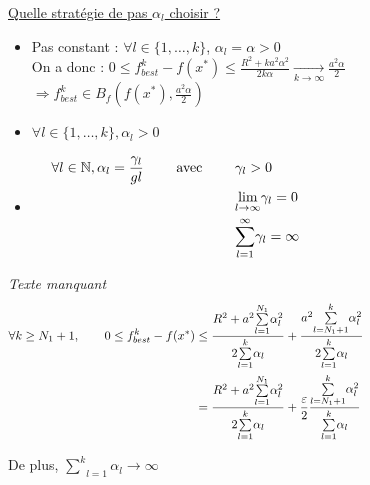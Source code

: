 \documentclass[12pt,a4paper]{article}
\begin{document}
\noindent \underline{Quelle stratégie de pas $\alpha_l$ choisir ?}
\begin{itemize}
    \item Pas constant : $\forall l \in \{1, \dots, k\}$, $\alpha_l = \alpha > 0$\\
    
    On a donc : $0 \leq f^k_{best} - f(x^*) \leq \frac{R^2 + ka^2 \alpha^2}{2 k \alpha} \xrightarrow[k \rightarrow \infty]{} \frac{a^2 \alpha}{2}$\\
    $\Rightarrow f^k_{best} \in B_f(f(x^*), \frac{a^2 \alpha}{2})$\\

    \item $\forall l \in \{1, \dots, k\}, \alpha_l > 0$\\
    
    \item \begin{align*}
        \forall l \in \mathbb{N}, \alpha_l = \frac{\gamma_l}{gl} \qquad \text{ avec } \qquad &\gamma_l > 0 \hspace{14.5cm}\\
        &\underset{l \rightarrow \infty}{\lim} \gamma_l = 0\\
        &\underset{l = 1}{\overset{\infty}{\sum}} \gamma_l = \infty\\
    \end{align*}
\end{itemize}

\textit{Texte manquant}\\




\begin{align*}
    \forall k \geq N_1 + 1, \qquad 0 \leq f^k_{best} - f(x^*) &\leq \frac{R^2 + a^2 \underset{l = 1}{\overset{N_1}{\sum}} \alpha_l^2}{2 \underset{l = 1}{\overset{k}{\sum}} \alpha_l} + \frac{a^2 \underset{l = N_1 + 1}{\overset{k}{\sum}} \alpha_l^2}{2 \underset{l = 1}{\overset{k}{\sum}} \alpha_l}  \hspace{14.5cm}\\
    &= \frac{R^2 + a^2 \underset{l = 1}{\overset{N_1}{\sum}} \alpha_l^2}{2 \underset{l = 1}{\overset{k}{\sum}} \alpha_l} + \frac{\varepsilon}{2} \frac{\underset{l = N_1 + 1}{\overset{k}{\sum}} \alpha_l^2}{\underset{l = 1}{\overset{k}{\sum}} \alpha_l}
\end{align*}

De plus, $\underset{l = 1}{\overset{k}{\sum}} \alpha_l \xrightarrow[]{} \infty$\\
\end{document}
